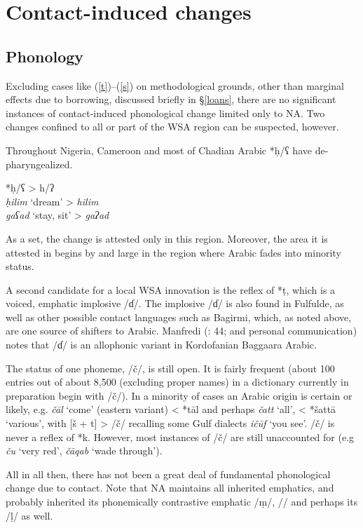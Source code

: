 \documentclass[output=paper]{langsci/langscibook}
\begin{document}
\section{Contact-induced changes
}

\subsection{Phonology}
\label{phon}

Excluding cases like (\ref{t})–(\ref{s}) on methodological grounds, other than marginal effects due to borrowing, discussed briefly in §\ref{loans}, there are no significant instances of contact-induced phonological change limited only to NA. Two changes confined to all or part of the WSA region can be suspected, however. 

Throughout Nigeria, Cameroon and most of Chadian Arabic *ḥ/ʕ have de-pharyngealized.

\ea 
*\textup{ḥ/ʕ} > h/ʔ\\
         \textit{ḥilim} ‘dream’ > \textit{hilim}\\
        \textit{gaʕad} ‘stay, sit’ > \textit{gaʔad}
\z

As a set, the change is attested only in this region. Moreover, the area it is attested in begins by and large in the region where Arabic fades into minority status. 

A second candidate for a local WSA innovation is the reflex of *ṭ, which is a voiced, emphatic implosive /ɗ/. The implosive /ɗ/ is also found in Fulfulde, as well as other possible contact languages such as Bagirmi, which, as noted above, are one source of shifters to Arabic. Manfredi (\citeyear{Manfredi2010}: 44; and personal communication) notes that /ɗ/ is an allophonic variant in Kordofanian Baggaara Arabic.

The status of one phoneme, /č/, is still open. It is fairly frequent (about 100 entries out of about 8,500 (excluding proper names) in a dictionary currently in preparation begin with /č/). In a minority of cases an Arabic origin is certain or likely, e.g. \textit{čāl} ‘come’ (eastern variant) < *tāl and perhaps \textit{čatt} ‘all’, < *šattā ‘various’, with [š + t] > /č/ recalling some Gulf dialects \textit{ičūf} ‘you see’. /č/ is never a reflex of *k. However, most instances of /č/ are still unaccounted for (e.g \textit{ču} ‘very red’, \textit{čāqab} ‘wade through’).

All in all then, there has not been a great deal of fundamental phonological change due to contact. Note that NA maintains all inherited emphatics, and probably inherited its phonemically contrastive emphatic /ṃ/, /{\R}/ and perhaps its /ḷ/ as well.
\end{document}
